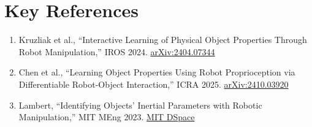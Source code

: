 \documentclass[10pt]{article}
\begin{document}
\section{Key References}
\begin{enumerate}[nosep,leftmargin=*]
    \small
    \item Kruzliak et al., ``Interactive Learning of Physical Object Properties Through Robot Manipulation,'' IROS 2024. \href{https://arxiv.org/abs/2404.07344}{arXiv:2404.07344}
    \item Chen et al., ``Learning Object Properties Using Robot Proprioception via Differentiable Robot-Object Interaction,'' ICRA 2025. \href{https://arxiv.org/abs/2410.03920}{arXiv:2410.03920}
    \item Lambert, ``Identifying Objects' Inertial Parameters with Robotic Manipulation,'' MIT MEng 2023. \href{https://dspace.mit.edu/handle/1721.1/151518}{MIT DSpace}
\end{enumerate}
\end{document}
